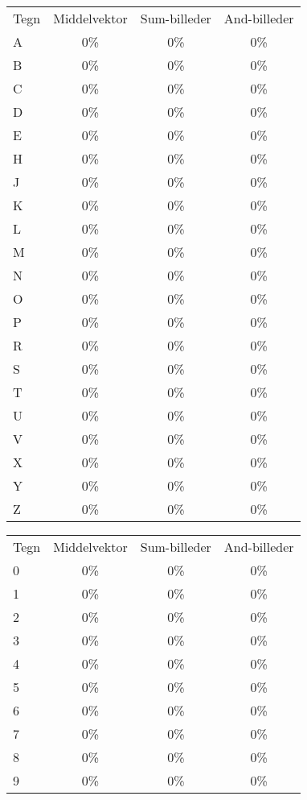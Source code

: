 \begin{tabular}{|l|c|c|c|}\hline
\rowcolor[gray]{0.9} \multicolumn{4}{|>{\columncolor[gray]{0.9}}c|}{\textbf{Træningssæt}} \\ \hline
Tegn & Middelvektor & Sum-billeder & And-billeder\\\hline
A & 0\% & 0\% & 0\%\\\hline
B & 0\% & 0\% & 0\%\\\hline
C & 0\% & 0\% & 0\%\\\hline
D & 0\% & 0\% & 0\%\\\hline
E & 0\% & 0\% & 0\%\\\hline
H & 0\% & 0\% & 0\%\\\hline
J & 0\% & 0\% & 0\%\\\hline
K & 0\% & 0\% & 0\%\\\hline 
L & 0\% & 0\% & 0\%\\\hline
M & 0\% & 0\% & 0\%\\\hline
N & 0\% & 0\% & 0\%\\\hline
O & 0\% & 0\% & 0\%\\\hline
P & 0\% & 0\% & 0\%\\\hline
R & 0\% & 0\% & 0\%\\\hline
S & 0\% & 0\% & 0\%\\\hline
T & 0\% & 0\% & 0\%\\\hline
U & 0\% & 0\% & 0\%\\\hline
V & 0\% & 0\% & 0\%\\\hline
X & 0\% & 0\% & 0\%\\\hline
Y & 0\% & 0\% & 0\%\\\hline
Z & 0\% & 0\% & 0\%\\\hline
\end{tabular}


\begin{tabular}{|l|c|c|c|}\hline
\rowcolor[gray]{0.9} \multicolumn{4}{|>{\columncolor[gray]{0.9}}c|}{\textbf{Kontrolsæt}} \\ \hline
Tegn & Middelvektor & Sum-billeder & And-billeder\\\hline
0 & 0\% & 0\% & 0\%\\\hline
1 & 0\%  & 0\% & 0\%\\\hline
2 & 0\% & 0\% & 0\%\\\hline
3 & 0\% & 0\% & 0\%\\\hline
4 & 0\% & 0\% & 0\%\\\hline
5 & 0\% & 0\% & 0\%\\\hline
6 & 0\% & 0\% & 0\%\\\hline
7 & 0\% & 0\% & 0\%\\\hline
8 & 0\% & 0\% & 0\%\\\hline
9 & 0\% & 0\% & 0\%\\\hline
\end{tabular}

